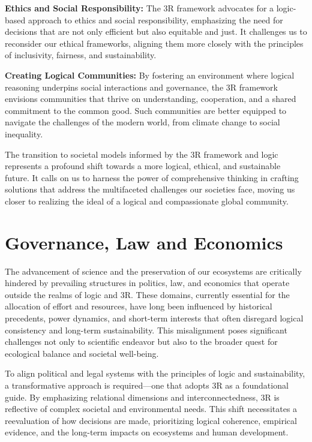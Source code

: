 \documentclass[12pt]{article}
\begin{document}
\textbf{Ethics and Social Responsibility:} The 3R framework advocates for a logic-based approach to ethics and social responsibility, emphasizing the need for decisions that are not only efficient but also equitable and just. It challenges us to reconsider our ethical frameworks, aligning them more closely with the principles of inclusivity, fairness, and sustainability.

\textbf{Creating Logical Communities:} By fostering an environment where logical reasoning underpins social interactions and governance, the 3R framework envisions communities that thrive on understanding, cooperation, and a shared commitment to the common good. Such communities are better equipped to navigate the challenges of the modern world, from climate change to social inequality.

The transition to societal models informed by the 3R framework and \qbit{} logic represents a profound shift towards a more logical, ethical, and sustainable future. It calls on us to harness the power of comprehensive thinking in crafting solutions that address the multifaceted challenges our societies face, moving us closer to realizing the ideal of a logical and compassionate global community.

\section*{Governance, Law and Economics}

The advancement of science and the preservation of our ecosystems are critically hindered by prevailing structures in politics, law, and economics that operate outside the realms of logic and 3R. These domains, currently essential for the allocation of effort and resources, have long been influenced by historical precedents, power dynamics, and short-term interests that often disregard logical consistency and long-term sustainability. This misalignment poses significant challenges not only to scientific endeavor but also to the broader quest for ecological balance and societal well-being.

To align political and legal systems with the principles of logic and sustainability, a transformative approach is required—one that adopts 3R as a foundational guide. By emphasizing relational dimensions and interconnectedness, 3R is reflective of complex societal and environmental needs. This shift necessitates a reevaluation of how decisions are made, prioritizing logical coherence, empirical evidence, and the long-term impacts on ecosystems and human development.
\end{document}
